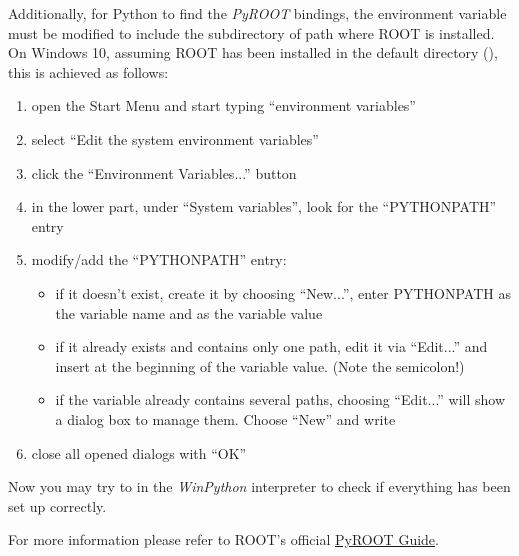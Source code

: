 \documentclass[a4paper,10pt,english]{sphinxmanual}
\begin{document}
Additionally, for Python to find the \emph{PyROOT} bindings, the 
environment variable must be modified to include the  subdirectory
of path where ROOT is installed. On Windows 10, assuming ROOT has been installed
in the default directory (), this is achieved as follows:
\begin{enumerate}
\item {} 
open the Start Menu and start typing ``environment variables''

\item {} 
select ``Edit the system environment variables''

\item {} 
click the ``Environment Variables...'' button

\item {} 
in the lower part, under ``System variables'', look for the ``PYTHONPATH'' entry

\item {} 
modify/add the ``PYTHONPATH'' entry:
\begin{itemize}
\item {} 
if it doesn't exist, create it by choosing ``New...'',
enter PYTHONPATH as the variable name
and  as the variable value

\item {} 
if it already exists and contains only one path, edit it via ``Edit...'' and
insert  at the beginning of the variable value.
(Note the semicolon!)

\item {} 
if the variable already contains several paths, choosing ``Edit...'' will
show a dialog box to manage them. Choose ``New'' and write

\end{itemize}

\item {} 
close all opened dialogs with ``OK''

\end{enumerate}

Now you may try to  in the \emph{WinPython} interpreter to check
if everything has been set up correctly.

For more information please refer to ROOT's official
\href{https://root.cern.ch/pyroot}{PyROOT Guide}.
\end{document}
